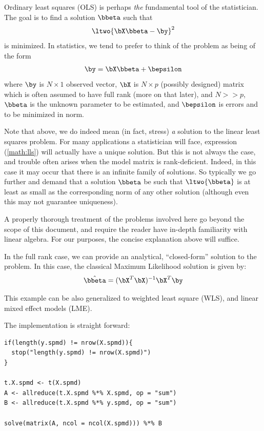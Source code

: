 Ordinary least squares (OLS)
is perhaps \emph{the} fundamental tool of the statistician.  The goal is to find a solution $\bbeta$ such that
\begin{align}
\ltwo{ \bX\bbeta - \by }^2 \label{math:lls}
\end{align}
is minimized.  In statistics, we tend to prefer to think of the problem as being of the form
\begin{align}
\by = \bX\bbeta + \bepsilon \label{math:statslls}
\end{align}
where $\by$ is $N\times 1$ observed vector,
$\bX$ is $N\times p$ (possibly designed) matrix which is often assumed to have full rank (more on that later), and $N >> p$,
$\bbeta$ is the unknown parameter to be estimated,
and $\bepsilon$ is errors and to be minimized in norm.

Note that above, we do indeed mean (in fact, stress) \emph{a} solution to the linear least squares problem.  For many applications a statistician will face, expression (\ref{math:lls}) will actually have a unique solution.  But this is not always the case, and trouble often arises when the model matrix is rank-deficient.  Indeed, in this case it may occur that there is an infinite family of solutions.  So typically we go further and demand that a solution $\bbeta$ be such that $\ltwo{\bbeta}$ is at least as small as the corresponding norm of any other solution (although even this may not guarantee uniqueness).

A properly thorough treatment of the problems involved here go beyond the scope of this document, and require the reader have in-depth familiarity with linear algebra.  For our purposes, the concise explanation above will suffice.  



In the full rank case, we can provide an analytical, ``closed-form'' solution to the problem.  In this case, the classical Maximum Likelihood solution is given by:
\begin{align}
 \hat{\bbeta} = (\bX^T\bX)^{-1}\bX^T\by \label{math:ols}
\end{align}
 
This example can be also generalized to weighted least square (WLS),
and linear mixed effect models (LME).

The implementation is straight forward:
\begin{lstlisting}[language=rr,title=R Code]
if(length(y.spmd) != nrow(X.spmd)){
  stop("length(y.spmd) != nrow(X.spmd)")
}

t.X.spmd <- t(X.spmd)
A <- allreduce(t.X.spmd %*% X.spmd, op = "sum")
B <- allreduce(t.X.spmd %*% y.spmd, op = "sum")

solve(matrix(A, ncol = ncol(X.spmd))) %*% B
\end{lstlisting}

